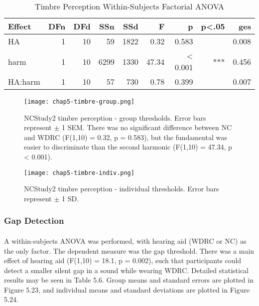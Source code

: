 \begin{table}[htp]
\begin{center}
\begin{tabular}{lrrrrrrrr}
       Effect & DFn & DFd  &  SSn &  SSd  &    F  &     p & p<.05  &   ges
       \\
       \hline
          HA &  1 & 10 &    59 & 1822 &  0.32 & 0.583  &     & 0.008 \\
        harm &  1 & 10 &  6299 & 1330 & 47.34 & < 0.001 &    *** & 0.456 \\
     HA:harm &  1 & 10 &    57 & 730  & 0.78 & 0.399    &   & 0.007 \\
     \hline
\end{tabular}
\end{center}
\caption{Timbre Perception Within-Subjects Factorial ANOVA}
\end{table}

\begin{figure}[htp]
\begin{center}
\texttt{[image: chap5-timbre-group.png]} \\
\caption[NCStudy2 timbre perception - group thresholds]{NCStudy2 timbre perception - group thresholds.  Error bars represent $\pm$ 1 SEM.  There was no significant difference between NC and WDRC (F(1,10) = 0.32, p = 0.583), but the fundamental was easier to discriminate than the second harmonic (F(1,10) = 47.34, p < 0.001).}
\label{chap5-timbre-group}
\end{center}
\end{figure}

\begin{figure}[htp]
\begin{center}
\texttt{[image: chap5-timbre-indiv.png]} \\
\caption[NCStudy2 timbre perception - individual thresholds]{NCStudy2 timbre perception - individual thresholds.  Error bars represent $\pm$ 1 SD.}
\label{chap5-timbre-indiv}
\end{center}
\end{figure}

\subsubsection{Gap Detection}
\paragraph{}A within-subjects ANOVA was performed, with hearing aid (WDRC or NC) as the only factor.  The dependent measure was the gap threshold.  There was a main effect of hearing aid (F(1,10) = 18.1, p = 0.002), such that participants could detect a smaller silent gap in a sound while wearing WDRC.  Detailed statistical results may be seen in Table 5.6.  Group means and standard errors are plotted in Figure 5.23, and individual means and standard deviations are plotted in Figure 5.24.

